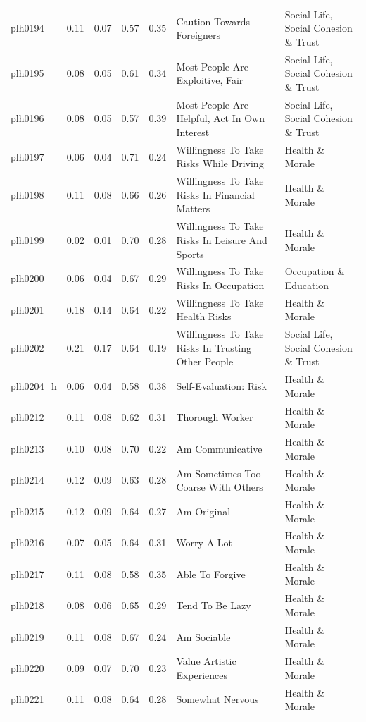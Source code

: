 \documentclass[
  12pt,
]{article}
\begin{document}
\begin{landscape}
\begin{scriptsize}
\begin{longtable}{|p{1.75in}|p{0.3in}|p{0.3in}|p{0.3in}|p{0.3in}|p{2.5in}|p{2.5in}}
plh0194 & 0.11 & 0.07 & 0.57 & 0.35 & Caution Towards Foreigners & Social Life, Social Cohesion \& Trust \\ 
plh0195 & 0.08 & 0.05 & 0.61 & 0.34 & Most People Are Exploitive, Fair & Social Life, Social Cohesion \& Trust \\ 
plh0196 & 0.08 & 0.05 & 0.57 & 0.39 & Most People Are Helpful, Act In Own Interest & Social Life, Social Cohesion \& Trust \\ 
plh0197 & 0.06 & 0.04 & 0.71 & 0.24 & Willingness To Take Risks While Driving & Health \& Morale \\ 
plh0198 & 0.11 & 0.08 & 0.66 & 0.26 & Willingness To Take Risks In Financial Matters & Health \& Morale \\ 
plh0199 & 0.02 & 0.01 & 0.70 & 0.28 & Willingness To Take Risks In Leisure And Sports & Health \& Morale \\ 
plh0200 & 0.06 & 0.04 & 0.67 & 0.29 & Willingness To Take Risks In Occupation & Occupation \& Education \\ 
plh0201 & 0.18 & 0.14 & 0.64 & 0.22 & Willingness To Take Health Risks & Health \& Morale \\ 
plh0202 & 0.21 & 0.17 & 0.64 & 0.19 & Willingness To Take Risks In Trusting Other People & Social Life, Social Cohesion \& Trust \\ 
plh0204\_h & 0.06 & 0.04 & 0.58 & 0.38 & Self-Evaluation: Risk & Health \& Morale \\ 
plh0212 & 0.11 & 0.08 & 0.62 & 0.31 & Thorough Worker & Health \& Morale \\ 
plh0213 & 0.10 & 0.08 & 0.70 & 0.22 & Am Communicative & Health \& Morale \\ 
plh0214 & 0.12 & 0.09 & 0.63 & 0.28 & Am Sometimes Too Coarse With Others & Health \& Morale \\ 
plh0215 & 0.12 & 0.09 & 0.64 & 0.27 & Am Original & Health \& Morale \\ 
plh0216 & 0.07 & 0.05 & 0.64 & 0.31 & Worry A Lot & Health \& Morale \\ 
plh0217 & 0.11 & 0.08 & 0.58 & 0.35 & Able To Forgive & Health \& Morale \\ 
plh0218 & 0.08 & 0.06 & 0.65 & 0.29 & Tend To Be Lazy & Health \& Morale \\ 
plh0219 & 0.11 & 0.08 & 0.67 & 0.24 & Am Sociable & Health \& Morale \\ 
plh0220 & 0.09 & 0.07 & 0.70 & 0.23 & Value Artistic Experiences & Health \& Morale \\ 
plh0221 & 0.11 & 0.08 & 0.64 & 0.28 & Somewhat Nervous & Health \& Morale \\ 

\end{longtable}
\end{scriptsize}
\end{landscape}
\end{document}
